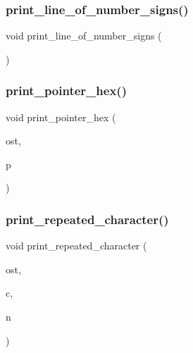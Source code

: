 \mbox{\label{util_8_c_a59b640c1f8b0040f26fa06b641191105}} 
\subsubsection{\texorpdfstring{print\+\_\+line\+\_\+of\+\_\+number\+\_\+signs()}{print\_line\_of\_number\_signs()}}
{\footnotesize\ttfamily void print\+\_\+line\+\_\+of\+\_\+number\+\_\+signs (\begin{DoxyParamCaption}{ }\end{DoxyParamCaption})}

\mbox{\label{util_8_c_a32add94de62a1d910cc0fc35ed90ab48}} 
\subsubsection{\texorpdfstring{print\+\_\+pointer\+\_\+hex()}{print\_pointer\_hex()}}
{\footnotesize\ttfamily void print\+\_\+pointer\+\_\+hex (\begin{DoxyParamCaption}\item[{ostream \&}]{ost,  }\item[{void $\ast$}]{p }\end{DoxyParamCaption})}

\mbox{\label{util_8_c_aadbeed81821ddead32a04006dc872fa2}} 
\subsubsection{\texorpdfstring{print\+\_\+repeated\+\_\+character()}{print\_repeated\_character()}}
{\footnotesize\ttfamily void print\+\_\+repeated\+\_\+character (\begin{DoxyParamCaption}\item[{ostream \&}]{ost,  }\item[{\mbox{\hyperlink{galois_8h_ab6cc7b4aeb6ea31aba2b3fbfc83ff5e6}{B\+Y\+TE}}}]{c,  }\item[{\mbox{\hyperlink{galois_8h_a09fddde158a3a20bd2dcadb609de11dc}{I\+NT}}}]{n }\end{DoxyParamCaption})}

